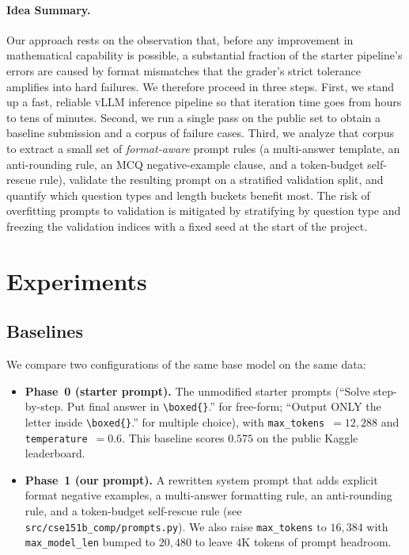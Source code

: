 \documentclass{article}
\begin{document}
\paragraph{Idea Summary.}
Our approach rests on the observation that, before any improvement in
mathematical capability is possible, a substantial fraction of the
starter pipeline's errors are caused by format mismatches that the
grader's strict tolerance amplifies into hard failures. We therefore
proceed in three steps. First, we stand up a fast, reliable
\textsc{vLLM} inference pipeline so that iteration time goes from
hours to tens of minutes. Second, we run a single pass on the public
set to obtain a baseline submission and a corpus of failure cases.
Third, we analyze that corpus to extract a small set of
\emph{format-aware} prompt rules (a multi-answer template, an
anti-rounding rule, an MCQ negative-example clause, and a token-budget
self-rescue rule), validate the resulting prompt on a stratified
validation split, and quantify which question types and length buckets
benefit most. The risk of overfitting prompts to validation is
mitigated by stratifying by question type and freezing the validation
indices with a fixed seed at the start of the project.


\section{Experiments}
\label{sec:experiments}

\subsection{Baselines}
\label{sec:baselines}

We compare two configurations of the same base model on the same data:
\begin{itemize}
    \item \textbf{Phase~0 (starter prompt).} The unmodified starter
          prompts (``Solve step-by-step. Put final answer in
          \verb|\boxed{}|.'' for free-form; ``Output ONLY the letter
          inside \verb|\boxed{}|.'' for multiple choice), with
          \texttt{max\_tokens}~$=12{,}288$ and
          \texttt{temperature}~$=0.6$. This baseline scores $0.575$ on
          the public Kaggle leaderboard.
    \item \textbf{Phase~1 (our prompt).} A rewritten system prompt
          that adds explicit format negative examples, a multi-answer
          formatting rule, an anti-rounding rule, and a token-budget
          self-rescue rule (see \texttt{src/cse151b\_comp/prompts.py}).
          We also raise \texttt{max\_tokens} to $16{,}384$ with
          \texttt{max\_model\_len} bumped to $20{,}480$ to leave $4$K
          tokens of prompt headroom.
\end{itemize}
\end{document}
